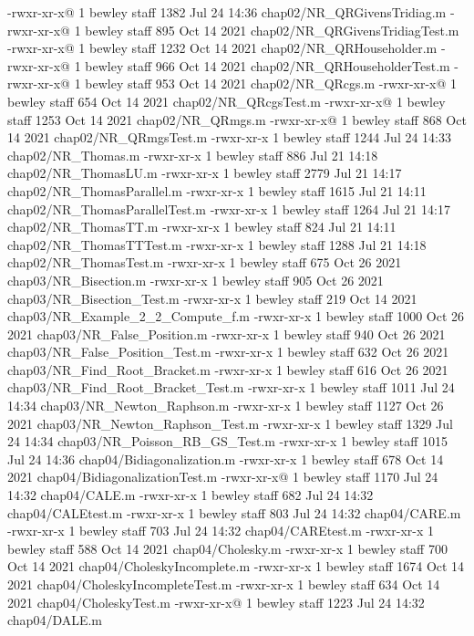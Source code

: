 -rwxr-xr-x@ 1 bewley  staff   1382 Jul 24 14:36 chap02/NR_QRGivensTridiag.m
-rwxr-xr-x@ 1 bewley  staff    895 Oct 14  2021 chap02/NR_QRGivensTridiagTest.m
-rwxr-xr-x@ 1 bewley  staff   1232 Oct 14  2021 chap02/NR_QRHouseholder.m
-rwxr-xr-x@ 1 bewley  staff    966 Oct 14  2021 chap02/NR_QRHouseholderTest.m
-rwxr-xr-x@ 1 bewley  staff    953 Oct 14  2021 chap02/NR_QRcgs.m
-rwxr-xr-x@ 1 bewley  staff    654 Oct 14  2021 chap02/NR_QRcgsTest.m
-rwxr-xr-x@ 1 bewley  staff   1253 Oct 14  2021 chap02/NR_QRmgs.m
-rwxr-xr-x@ 1 bewley  staff    868 Oct 14  2021 chap02/NR_QRmgsTest.m
-rwxr-xr-x  1 bewley  staff   1244 Jul 24 14:33 chap02/NR_Thomas.m
-rwxr-xr-x  1 bewley  staff    886 Jul 21 14:18 chap02/NR_ThomasLU.m
-rwxr-xr-x  1 bewley  staff   2779 Jul 21 14:17 chap02/NR_ThomasParallel.m
-rwxr-xr-x  1 bewley  staff   1615 Jul 21 14:11 chap02/NR_ThomasParallelTest.m
-rwxr-xr-x  1 bewley  staff   1264 Jul 21 14:17 chap02/NR_ThomasTT.m
-rwxr-xr-x  1 bewley  staff    824 Jul 21 14:11 chap02/NR_ThomasTTTest.m
-rwxr-xr-x  1 bewley  staff   1288 Jul 21 14:18 chap02/NR_ThomasTest.m
-rwxr-xr-x  1 bewley  staff    675 Oct 26  2021 chap03/NR_Bisection.m
-rwxr-xr-x  1 bewley  staff    905 Oct 26  2021 chap03/NR_Bisection_Test.m
-rwxr-xr-x  1 bewley  staff    219 Oct 14  2021 chap03/NR_Example_2_2_Compute_f.m
-rwxr-xr-x  1 bewley  staff   1000 Oct 26  2021 chap03/NR_False_Position.m
-rwxr-xr-x  1 bewley  staff    940 Oct 26  2021 chap03/NR_False_Position_Test.m
-rwxr-xr-x  1 bewley  staff    632 Oct 26  2021 chap03/NR_Find_Root_Bracket.m
-rwxr-xr-x  1 bewley  staff    616 Oct 26  2021 chap03/NR_Find_Root_Bracket_Test.m
-rwxr-xr-x  1 bewley  staff   1011 Jul 24 14:34 chap03/NR_Newton_Raphson.m
-rwxr-xr-x  1 bewley  staff   1127 Oct 26  2021 chap03/NR_Newton_Raphson_Test.m
-rwxr-xr-x  1 bewley  staff   1329 Jul 24 14:34 chap03/NR_Poisson_RB_GS_Test.m
-rwxr-xr-x  1 bewley  staff   1015 Jul 24 14:36 chap04/Bidiagonalization.m
-rwxr-xr-x  1 bewley  staff    678 Oct 14  2021 chap04/BidiagonalizationTest.m
-rwxr-xr-x@ 1 bewley  staff   1170 Jul 24 14:32 chap04/CALE.m
-rwxr-xr-x  1 bewley  staff    682 Jul 24 14:32 chap04/CALEtest.m
-rwxr-xr-x  1 bewley  staff    803 Jul 24 14:32 chap04/CARE.m
-rwxr-xr-x  1 bewley  staff    703 Jul 24 14:32 chap04/CAREtest.m
-rwxr-xr-x  1 bewley  staff    588 Oct 14  2021 chap04/Cholesky.m
-rwxr-xr-x  1 bewley  staff    700 Oct 14  2021 chap04/CholeskyIncomplete.m
-rwxr-xr-x  1 bewley  staff   1674 Oct 14  2021 chap04/CholeskyIncompleteTest.m
-rwxr-xr-x  1 bewley  staff    634 Oct 14  2021 chap04/CholeskyTest.m
-rwxr-xr-x@ 1 bewley  staff   1223 Jul 24 14:32 chap04/DALE.m
